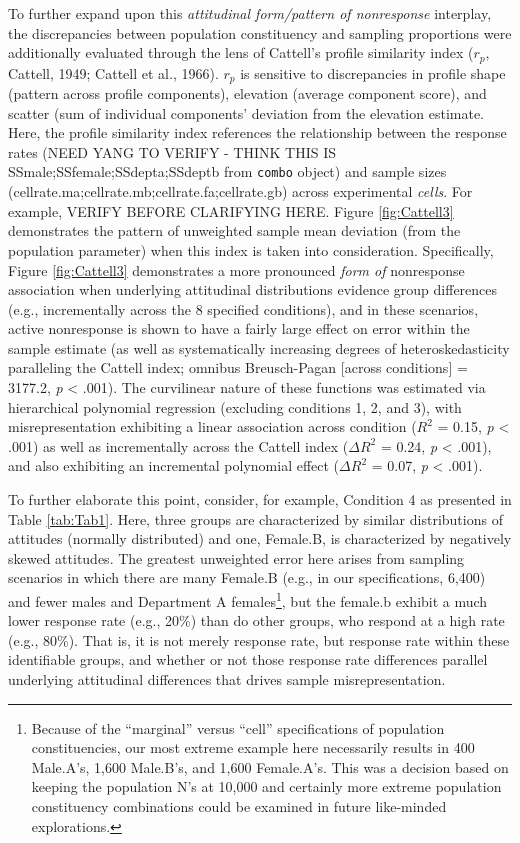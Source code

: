 \documentclass[
  man,mask]{apa7}
\begin{document}
To further expand upon this \emph{attitudinal form/pattern of nonresponse} interplay, the discrepancies between population constituency and sampling proportions were additionally evaluated through the lens of Cattell's profile similarity index (\(r_p\), Cattell, 1949; Cattell et al., 1966). \(r_p\) is sensitive to discrepancies in profile shape (pattern across profile components), elevation (average component score), and scatter (sum of individual components' deviation from the elevation estimate. Here, the profile similarity index references the relationship between the response rates (NEED YANG TO VERIFY - THINK THIS IS SSmale;SSfemale;SSdepta;SSdeptb from \texttt{combo} object) and sample sizes (cellrate.ma;cellrate.mb;cellrate.fa;cellrate.gb) across experimental \emph{cells}. For example, VERIFY BEFORE CLARIFYING HERE. Figure \ref{fig:Cattell3} demonstrates the pattern of unweighted sample mean deviation (from the population parameter) when this index is taken into consideration. Specifically, Figure \ref{fig:Cattell3} demonstrates a more pronounced \emph{form of} nonresponse association when underlying attitudinal distributions evidence group differences (e.g., incrementally across the 8 specified conditions), and in these scenarios, active nonresponse is shown to have a fairly large effect on error within the sample estimate (as well as systematically increasing degrees of heteroskedasticity paralleling the Cattell index; omnibus Breusch-Pagan {[}across conditions{]} = 3177.2, \emph{p} \textless{} .001). The curvilinear nature of these functions was estimated via hierarchical polynomial regression (excluding conditions 1, 2, and 3), with misrepresentation exhibiting a linear association across condition (\(R^2\) = 0.15, \emph{p} \textless{} .001) as well as incrementally across the Cattell index (\(\Delta{R^2}\) = 0.24, \emph{p} \textless{} .001), and also exhibiting an incremental polynomial effect (\(\Delta{R^2}\) = 0.07, \emph{p} \textless{} .001).

To further elaborate this point, consider, for example, Condition 4 as presented in Table \ref{tab:Tab1}. Here, three groups are characterized by similar distributions of attitudes (normally distributed) and one, Female.B, is characterized by negatively skewed attitudes. The greatest unweighted error here arises from sampling scenarios in which there are many Female.B (e.g., in our specifications, 6,400) and fewer males and Department A females\footnote{Because of the ``marginal'' versus ``cell'' specifications of population constituencies, our most extreme example here necessarily results in 400 Male.A's, 1,600 Male.B's, and 1,600 Female.A's. This was a decision based on keeping the population N's at 10,000 and certainly more extreme population constituency combinations could be examined in future like-minded explorations.}, but the female.b exhibit a much lower response rate (e.g., 20\%) than do other groups, who respond at a high rate (e.g., 80\%). That is, it is not merely response rate, but response rate within these identifiable groups, and whether or not those response rate differences parallel underlying attitudinal differences that drives sample misrepresentation.
\end{document}

